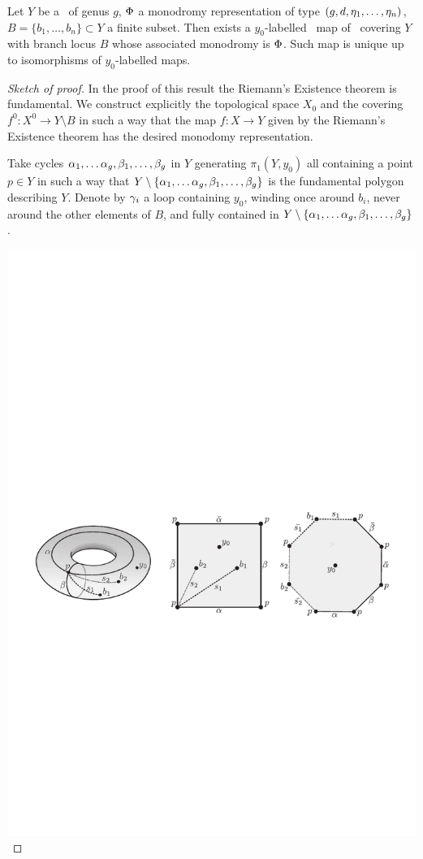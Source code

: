 \documentclass[../main/main.tex]{subfiles}
\begin{document}
\begin{theorem}[{\cite[Thm. 7.2.2]{CM}}]
	Let $Y$ be a \rs\ of genus $g$, $\Phi$ a monodromy representation of type $(g,d,\eta_1,\ldots,\eta_n)$, $B=\{b_1,\ldots,b_n\}\subset Y$ a finite subset. Then exists a $y_0$-labelled \holo\ map of \rs\ covering $Y$ with branch locus $B$ whose associated monodromy is $\Phi$. Such map is unique up to isomorphisms of $y_0$-labelled maps. 
\end{theorem}
\begin{proof}[Sketch of proof]
	In the proof of this result the Riemann's Existence theorem is fundamental. We construct explicitly the topological space $X_0$ and the covering $f^0\colon X^0\to Y\setminus B$ in such a way that the map $f\colon X\to Y$ given by the Riemann's Existence theorem has the desired monodomy representation. 
	
	Take cycles $\alpha_1,\ldots\alpha_g,\beta_1,\ldots,\beta_g$ in $Y$ generating $\pi_1(Y,y_0)$ all containing a point $p\in Y$ in such a way that $Y\setminus\{\alpha_1,\ldots\alpha_g,\beta_1,\ldots,\beta_g\}$ is the fundamental polygon describing $Y$. Denote by $\gamma_i$ a loop containing $y_0$, winding once around $b_i$, never around the other elements of $B$, and fully contained in $Y\setminus\{\alpha_1,\ldots\alpha_g,\beta_1,\ldots,\beta_g\}$.
	
	

	\includegraphics[]{../figures/CM-fig-7-6.pdf}
	

\end{proof}
\end{document}
